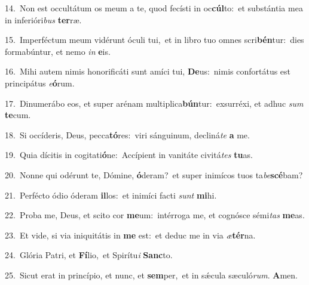 {\numbfont\textcolor{\numbcolor}{14.}}~Non est occultátum os meum a te, quod fecísti in oc\-\textbf{cúl}\-to:~\star et substántia mea in inferióri\textit{bus} \textbf{ter}\-ræ.\par
{\numbfont\textcolor{\numbcolor}{15.}}~Imperféctum meum vidérunt óculi tui,~\dagger et in libro tuo omnes scri\-\textbf{bén}\-tur:~\star dies formabúntur, et nemo \textit{in} \textbf{e}\-is.\par
{\numbfont\textcolor{\numbcolor}{16.}}~Mihi autem nimis honorificáti sunt amíci tui, \textbf{De}\-us:~\star nimis confortátus est principátus \textit{e}\-\textbf{ó}rum.\par
{\numbfont\textcolor{\numbcolor}{17.}}~Dinumerábo eos, et super arénam multiplica\-\textbf{bún}\-tur:~\star exsurréxi, et adhuc \textit{sum} \textbf{te}\-cum.\par
{\numbfont\textcolor{\numbcolor}{18.}}~Si occíderis, Deus, pecca\-\textbf{tó}\-res:~\star viri sánguinum, decliná\textit{te} \textbf{a} me.\par
{\numbfont\textcolor{\numbcolor}{19.}}~Quia dícitis in cogitati\-\textbf{ó}\-ne:~\star Accípient in vanitáte civitá\textit{tes} \textbf{tu}\-as.\par
{\numbfont\textcolor{\numbcolor}{20.}}~Nonne qui odérunt te, Dómine, \textbf{ó}\-deram?~\star et super inimícos tuos ta\-\textit{be}\-\textbf{scé}bam?\par
{\numbfont\textcolor{\numbcolor}{21.}}~Perfécto ódio óderam \textbf{il}\-los:~\star et inimíci facti \textit{sunt} \textbf{mi}\-hi.\par
{\numbfont\textcolor{\numbcolor}{22.}}~Proba me, Deus, et scito cor \textbf{me}\-um:~\star intérroga me, et cognósce sémi\textit{tas} \textbf{me}\-as.\par
{\numbfont\textcolor{\numbcolor}{23.}}~Et vide, si via iniquitátis in \textbf{me} est:~\star et deduc me in via \textit{æ}\-\textbf{tér}na.\par
{\numbfont\textcolor{\numbcolor}{24.}}~Glória Patri, et \textbf{Fí}\-lio,~\star et Spirítu\textit{i} \textbf{Sanc}\-to.\par
{\numbfont\textcolor{\numbcolor}{25.}}~Sicut erat in princípio, et nunc, et \textbf{sem}\-per,~\star et in sǽcula sæculó\-\textit{rum}\-. \textbf{A}\-men.\par
